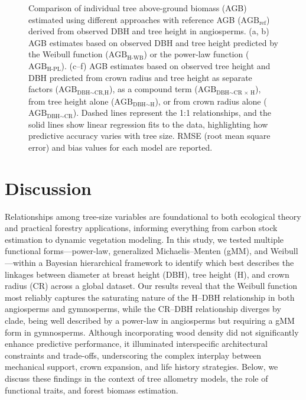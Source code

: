 \documentclass[
  12pt,
  letterpaper,
  DIV=11,
  numbers=noendperiod]{scrartcl}
\makeatletter
\newcommand*\pandocbounded[1]{%
  \sbox\pandoc@box{#1}%
  \Gscale@div\@tempa{\textheight}{\dimexpr\ht\pandoc@box+\dp\pandoc@box\relax}%
  \Gscale@div\@tempb{\linewidth}{\wd\pandoc@box}%
  \ifdim\@tempb\p@<\@tempa\p@\let\@tempa\@tempb\fi%
  \ifdim\@tempa\p@<\p@\scalebox{\@tempa}{\usebox\pandoc@box}%
  \else\usebox{\pandoc@box}%
  \fi%
}
\makeatother
\begin{document}
\begin{figure}[H]

\centering{

\pandocbounded{\texttt{[image: ../figs/agb\_ang.png]}}

}

\caption{\label{fig-agb}Comparison of individual tree above-ground
biomass (AGB) estimated using different approaches with reference AGB
(\(\text{AGB}_\text{ref}\)) derived from observed DBH and tree height in
angiosperms. (a, b) AGB estimates based on observed DBH and tree height
predicted by the Weibull function (\(\text{AGB}_\text{H-WB}\)) or the
power-law function (\(\text{AGB}_\text{H-PL}\)). (c--f) AGB estimates
based on observed tree height and DBH predicted from crown radius and
tree height as separate factors
(\(\text{AGB}_{\text{DBH} \sim \text{CR,H}}\)), as a compound term
(\(\text{AGB}_{\text{DBH} \sim \text{CR × H}}\)), from tree height alone
(\(\text{AGB}_{\text{DBH} \sim \text{H}}\)), or from crown radius alone
(\(\text{AGB}_{\text{DBH} \sim \text{CR}}\)). Dashed lines represent the
1:1 relationships, and the solid lines show linear regression fits to
the data, highlighting how predictive accuracy varies with tree size.
RMSE (root mean square error) and bias values for each model are
reported.}

\end{figure}%

\section{Discussion}\label{discussion}

Relationships among tree-size variables are foundational to both
ecological theory and practical forestry applications, informing
everything from carbon stock estimation to dynamic vegetation modeling.
In this study, we tested multiple functional forms---power-law,
generalized Michaelis--Menten (gMM), and Weibull---within a Bayesian
hierarchical framework to identify which best describes the linkages
between diameter at breast height (DBH), tree height (H), and crown
radius (CR) across a global dataset. Our results reveal that the Weibull
function most reliably captures the saturating nature of the H--DBH
relationship in both angiosperms and gymnosperms, while the CR--DBH
relationship diverges by clade, being well described by a power-law in
angiosperms but requiring a gMM form in gymnosperms. Although
incorporating wood density did not significantly enhance predictive
performance, it illuminated interspecific architectural constraints and
trade-offs, underscoring the complex interplay between mechanical
support, crown expansion, and life history strategies. Below, we discuss
these findings in the context of tree allometry models, the role of
functional traits, and forest biomass estimation.
\end{document}

